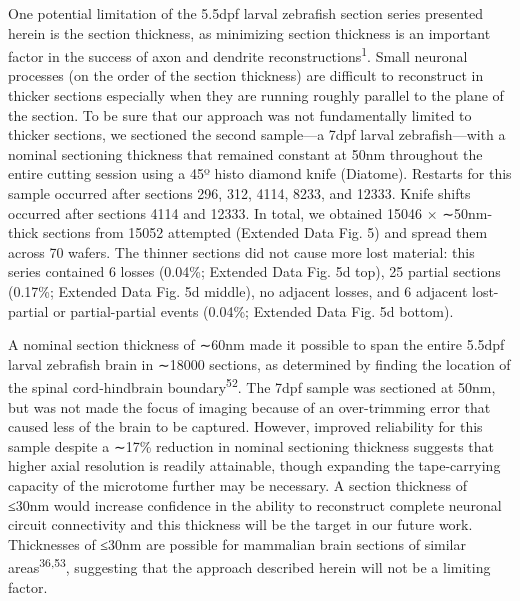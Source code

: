 \documentclass{article}
\begin{document}
One potential limitation of the 5.5dpf larval zebrafish section series presented herein is the section thickness, as minimizing section thickness is an important factor in the success of axon and dendrite reconstructions\textsuperscript{1}. Small neuronal processes (on the order of the section thickness) are difficult to reconstruct in thicker sections especially when they are running roughly parallel to the plane of the section. To be sure that our approach was not fundamentally limited to thicker sections, we sectioned the second sample—a 7dpf larval zebrafish—with a nominal sectioning thickness that remained constant at 50nm throughout the entire cutting
session using a 45º histo diamond knife (Diatome). Restarts for this sample occurred after sections 296, 312, 4114, 8233, and 12333. Knife shifts occurred after sections 4114 and 12333. In total, we obtained 15046 × ∼50nm-thick sections from 15052 attempted (Extended Data Fig. 5) and spread them across 70 wafers. The thinner sections did not cause more lost material: this series contained 6 losses (0.04\%; Extended Data Fig. 5d top), 25 partial sections (0.17\%; Extended Data Fig. 5d middle), no adjacent losses, and 6 adjacent lost-partial or partial-partial events (0.04\%; Extended Data Fig. 5d bottom).

A nominal section thickness of ∼60nm made it possible to span the entire 5.5dpf larval zebrafish brain in ∼18000 sections, as determined by finding the location of the spinal cord-hindbrain boundary\textsuperscript{52}. The 7dpf sample was sectioned at 50nm, but was not made the focus of imaging because of an over-trimming error that caused less of the brain to be captured. However, improved reliability for this sample despite a ∼17\% reduction in nominal sectioning thickness suggests that higher axial resolution is readily attainable, though expanding the tape-carrying capacity of the microtome further may be necessary. A section thickness of ≤30nm would increase confidence in the ability to reconstruct complete neuronal circuit connectivity and this thickness will be the target in our future work. Thicknesses of ≤30nm are possible for mammalian brain sections of similar areas\textsuperscript{36,53}, suggesting that the approach described herein will not be a limiting factor.
\end{document}
